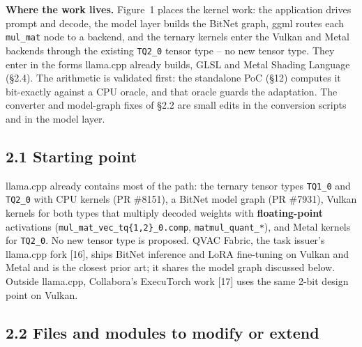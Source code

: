 \documentclass[
  10pt,
]{article}
\begin{document}
\textbf{Where the work lives.} Figure~1 places the kernel work: the
application drives prompt and decode, the model layer builds the BitNet
graph, ggml routes each \texttt{mul\_mat} node to a backend, and the
ternary kernels enter the Vulkan and Metal backends through the existing
\texttt{TQ2\_0} tensor type -- no new tensor type. They enter in the
forms llama.cpp already builds, GLSL and Metal Shading Language
(\S{}2.4). The arithmetic is validated first: the standalone PoC
(\S{}12) computes it bit-exactly against a CPU oracle, and that oracle
guards the adaptation. The converter and model-graph fixes of \S{}2.2
are small edits in the conversion scripts and in the model layer.

\subsection{2.1 Starting point}\label{starting-point}

llama.cpp already contains most of the path: the ternary tensor types
\texttt{TQ1\_0} and \texttt{TQ2\_0} with CPU kernels (PR \#8151), a
BitNet model graph (PR \#7931), Vulkan kernels for both types that
multiply decoded weights with \textbf{floating-point} activations
(\texttt{mul\_mat\_vec\_tq\{1,2\}\_0.comp}, \texttt{matmul\_quant\_*}),
and Metal kernels for \texttt{TQ2\_0}. No new tensor type is proposed.
QVAC Fabric, the task issuer's llama.cpp fork [16], ships BitNet
inference and LoRA fine-tuning on Vulkan and Metal and is the closest
prior art; it shares the model graph discussed below. Outside llama.cpp,
Collabora's ExecuTorch work [17] uses the same 2-bit design point on
Vulkan.

\subsection{2.2 Files and modules to modify or
extend}\label{files-and-modules-to-modify-or-extend}
\end{document}
